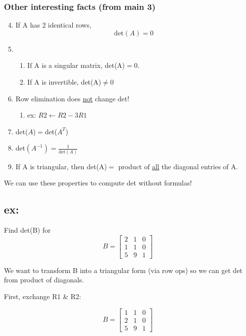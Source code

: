 \documentclass[twocolumn,draft]{article}
\begin{document}
  \subsubsection*{Other interesting facts (from main 3)}
  \begin{enumerate}
	\setcounter{enumi}{3}
  	\item If A has 2 identical rows,
		\begin{equation*}
			\text{det}(A) = 0
		\end{equation*}
	\setcounter{enumi}{7}
	\item
		\begin{enumerate}
			\item If A is a singular matrix, det(A)$=0$.
			\item If A is invertible, det(A)$\neq0$
		\end{enumerate} 
	\setcounter{enumi}{4}
	\item Row elimination does \underline{not} change det!
		\begin{enumerate}
			\item ex: $R2 \leftarrow R2 - 3R1$
		\end{enumerate}
	\setcounter{enumi}{9}
	\item det($A$)$=$det($A^{T}$)
	\setcounter{enumi}{8}
	\item det$(A^{-1})=\frac{1}{\text{det}(A)}$
	\setcounter{enumi}{6}
	\item If A is triangular, then det(A)$=$ product of \underline{all} the diagonal entries of A.
  \end{enumerate}
  
  We can use these properties to compute det without formulas! %
  
  \subsection*{ex:} Find det(B) for
  \begin{equation*}
  	B = \begin{bmatrix}
  			2 & 1 & 0 \\
			1 & 1 & 0 \\
			5 & 9 & 1
  		\end{bmatrix}
  \end{equation*}
  
  We want to transform B into a triangular form (via row ops) so we can get det from product of
  diagonals.
  
  First, exchange R1 \& R2:
  
  \begin{equation*}
  	B = \begin{bmatrix}
  			1 & 1 & 0 \\
			2 & 1 & 0 \\
			5 & 9 & 1
  		\end{bmatrix} \tag*{$-$det(B)}
  \end{equation*}
  
\end{document}
